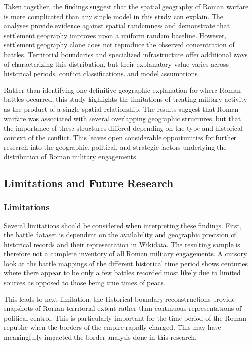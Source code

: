 \documentclass[
  letterpaper,
  DIV=11,
  numbers=noendperiod]{scrartcl}
\begin{document}
Taken together, the findings suggest that the spatial geography of Roman
warfare is more complicated than any single model in this study can
explain. The analyses provide evidence against spatial randomness and
demonstrate that settlement geography improves upon a uniform random
baseline. However, settlement geography alone does not reproduce the
observed concentration of battles. Territorial boundaries and
specialized infrastructure offer additional ways of characterizing this
distribution, but their explanatory value varies across historical
periods, conflict classifications, and model assumptions.

Rather than identifying one definitive geographic explanation for where
Roman battles occurred, this study highlights the limitations of
treating military activity as the product of a single spatial
relationship. The results suggest that Roman warfare was associated with
several overlapping geographic structures, but that the importance of
these structures differed depending on the type and historical context
of the conflict. This leaves open considerable opportunities for further
research into the geographic, political, and strategic factors
underlying the distribution of Roman military engagements.

\subsection{Limitations and Future
Research}\label{limitations-and-future-research}

\subsubsection{Limitations}\label{limitations}

Several limitations should be considered when interpreting these
findings. First, the battle dataset is dependent on the availability and
geographic precision of historical records and their representation in
Wikidata. The resulting sample is therefore not a complete inventory of
all Roman military engagements. A cursory look at the battle mappings of
the different historical time period shows centuries where there appear
to be only a few battles recorded most likely due to limited sources as
opposed to those being true times of peace.

This leads to next limitation, the historical boundary reconstructions
provide snapshots of Roman territorial extent rather than continuous
representations of political control. This is particularly important for
the time period of the Roman republic when the borders of the empire
rapidly changed. This may have meaningfully impacted the border analysis
done in this research.
\end{document}
